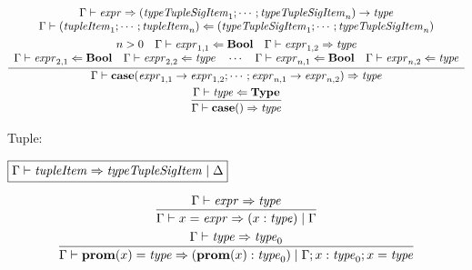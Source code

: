 \begin{gather*}
{    \begin{array}{c}
      \Gamma \vdash \mathit{expr} \Rightarrow (\mathit{typeTupleSigItem}_1; \cdots; \mathit{typeTupleSigItem}_n) \rightarrow \mathit{type}
      \\
      \Gamma \vdash (\mathit{tupleItem}_1; \cdots; \mathit{tupleItem}_n) \Leftarrow (\mathit{typeTupleSigItem}_1; \cdots; \mathit{typeTupleSigItem}_n)
    \end{array}
  }
  \\
  \infer{\Gamma \vdash \mathbf{case}(\mathit{expr}_{1,1} \rightarrow \mathit{expr}_{1,2}; \cdots; \mathit{expr}_{n,1} \rightarrow \mathit{expr}_{n,2}) \Rightarrow \mathit{type}}{
    \begin{array}{c}
      n > 0
      \hspace{1em}
      \Gamma \vdash \mathit{expr}_{1, 1} \Leftarrow \mathbf{Bool}
      \hspace{1em}
      \Gamma \vdash \mathit{expr}_{1, 2} \Rightarrow \mathit{type}
      \\
      \Gamma \vdash \mathit{expr}_{2, 1} \Leftarrow \mathbf{Bool}
      \hspace{1em}
      \Gamma \vdash \mathit{expr}_{2, 2} \Leftarrow \mathit{type}
      \hspace{1em}
      \cdots
      \hspace{1em}
      \Gamma \vdash \mathit{expr}_{n, 1} \Leftarrow \mathbf{Bool}
      \hspace{1em}
      \Gamma \vdash \mathit{expr}_{n, 2} \Leftarrow \mathit{type}
    \end{array}
  }
  \\
  \infer{\Gamma \vdash \mathbf{case}() \Rightarrow \mathit{type}}{
    \Gamma \vdash \mathit{type} \Leftarrow \mathbf{Type}
  }
\end{gather*}

Tuple:

$\fbox{$\Gamma \vdash \mathit{tupleItem} \Rightarrow \mathit{typeTupleSigItem} \mid \Delta$}$

\begin{gather*}
  \infer{\Gamma \vdash x = \mathit{expr} \Rightarrow (x: \mathit{type}) \mid \Gamma}{
    \Gamma \vdash \mathit{expr} \Rightarrow \mathit{type}
  }
  \\
  \infer{\Gamma \vdash \mathbf{prom}(x) = \mathit{type} \Rightarrow (\mathbf{prom}(x): \mathit{type}_0) \mid \Gamma; x: \mathit{type}_0; x = \mathit{type}}{
    \Gamma \vdash \mathit{type} \Rightarrow \mathit{type}_0
  }
\end{gather*}

